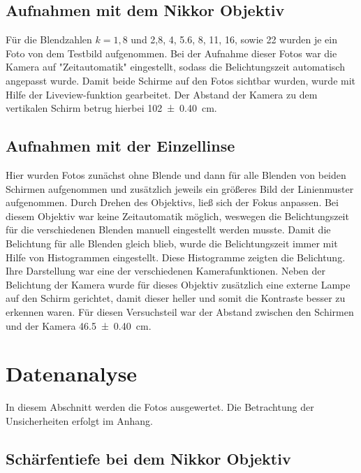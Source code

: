	\subsection{Aufnahmen mit dem Nikkor Objektiv}
		
		Für die Blendzahlen $k=1,8$ und 2,8, 4, 5.6, 8, 11, 16, sowie 22 wurden je ein Foto von dem Testbild aufgenommen.
		Bei der Aufnahme dieser Fotos war die Kamera auf "Zeitautomatik" eingestellt, sodass die Belichtungszeit automatisch angepasst wurde.
		Damit beide Schirme auf den Fotos sichtbar wurden, wurde mit Hilfe der Liveview-funktion gearbeitet.
		Der Abstand der Kamera zu dem vertikalen Schirm betrug hierbei \SI{102+-0,40}{\centi\meter}.
		
	\subsection{Aufnahmen mit der Einzellinse}
	
		Hier wurden Fotos zunächst ohne Blende und dann für alle Blenden von beiden Schirmen aufgenommen und zusätzlich jeweils ein größeres Bild der Linienmuster aufgenommen.
		Durch Drehen des Objektivs, ließ sich der Fokus anpassen.
		Bei diesem Objektiv war keine Zeitautomatik möglich, weswegen die Belichtungszeit für die verschiedenen Blenden manuell eingestellt werden musste.
		Damit die Belichtung für alle Blenden gleich blieb, wurde die Belichtungszeit immer mit Hilfe von Histogrammen eingestellt.
		Diese Histogramme zeigten die Belichtung.
		Ihre Darstellung war eine der verschiedenen Kamerafunktionen.
		Neben der Belichtung der Kamera wurde für dieses Objektiv zusätzlich eine externe Lampe auf den Schirm gerichtet, damit dieser heller und somit die Kontraste besser zu erkennen waren. 
		Für diesen Versuchsteil war der Abstand zwischen den Schirmen und der Kamera \SI{46,5+-0,40}{\centi\meter}.
		
\section{Datenanalyse} \label{sec:Analyse}
	
	In diesem Abschnitt werden die Fotos ausgewertet.
	Die Betrachtung der Unsicherheiten erfolgt im Anhang.
	
	\subsection{Schärfentiefe bei dem Nikkor Objektiv}
		
